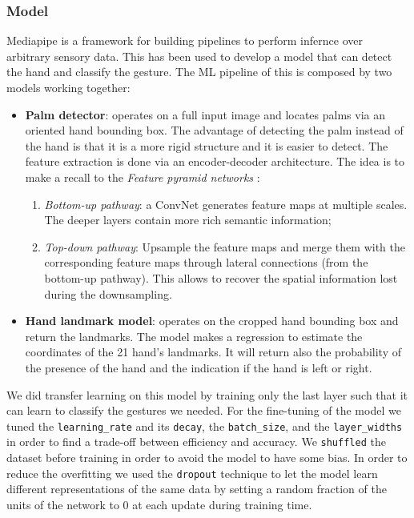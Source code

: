 \documentclass[10pt,twocolumn,letterpaper]{article}
\begin{document}
\subsubsection{Model}
Mediapipe is a framework for building pipelines to perform infernce over arbitrary sensory data. This has been used to develop a model that can detect the hand and classify the gesture.
The ML pipeline of this is composed by two models working together:
\begin{itemize}
   \item \textbf{Palm detector}: operates on a full input image and locates palms via an oriented hand bounding box. The advantage of detecting the palm instead of the hand 
   is that it is a more rigid structure and it is easier to detect. The feature extraction is done via an encoder-decoder architecture. The idea is to make a recall to the 
   \textit{Feature pyramid networks} \cite{lin2017featurepyramidnetworksobject}:
   \begin{enumerate}
      \item \textit{Bottom-up pathway}: a ConvNet generates feature maps at multiple scales. The deeper layers contain more rich semantic information;
      \item \textit{Top-down pathway}: Upsample the feature maps and merge them with the corresponding feature maps through lateral connections (from the bottom-up pathway).
      This allows to recover the spatial information lost during the downsampling.
   \end{enumerate}
   \item \textbf{Hand landmark model}: operates on the cropped hand bounding box and return the landmarks. 
   The model makes a regression to estimate the coordinates of the 21 hand's landmarks. It will return also the probability of the presence of the hand and 
   the indication if the hand is left or right.
\end{itemize}
We did transfer learning on this model by training only the last layer such that it can learn to classify the gestures we needed.
For the fine-tuning of the model we tuned the \texttt{learning\_rate} and its \texttt{decay}, 
the \texttt{batch\_size}, and the \texttt{layer\_widths} in order to find a trade-off between 
efficiency and accuracy.
We \texttt{shuffled} the dataset before training in order to avoid the model to have some bias.
In order to reduce the overfitting we used the \texttt{dropout} technique to 
let the model learn different representations of the same data by setting a random fraction of 
the units of the network to 0 at each update during training time.
\end{document}
